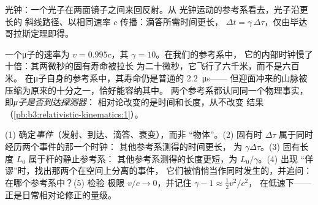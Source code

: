 \begin{omfigure}

{\small 光钟：一个光子在两面镜子之间来回反射。从
光钟运动的参考系看去，光子沿更长的
斜线路径、以相同速率 $c$ 传播：滴答所需时间更长，
$\Delta t = \gamma\,\Delta\tau$，仅由毕达哥拉斯定理即得。}
\end{omfigure}

\begin{example}[μ子的两种解释]\label{ex:b3:relativistic-kinematics:muon}
一个μ子的速率为 $v = 0.995c$，其 $\gamma = 10$。在我们的参考系中，
它的内部时钟慢了十倍：其两微秒的固有寿命被拉长
为二十微秒，它飞行了六千米，而不是六百米。
在μ子自身的参考系中，其寿命仍是普通的 \qty{2.2}{\micro s}——
但迎面冲来的山脉被压缩为原来的十分之一，恰好能容纳其中。
两个参考系都认同同一个物理事实，即\emph{μ子是否到达探测器}：
相对论改变的是时间和长度，从不改变
结果（\cref{pb:b3:relativistic-kinematics:1}）。
\end{example}

\begin{method}[理清各种效应]\label{met:b3:relativistic-kinematics:method}
(1) 确定\emph{事件}（发射、到达、滴答、衰变），而非
“物体”。(2) 固有时 $\Delta\tau$ 属于同时经历两个事件的那一个时钟：
其他参考系测得的时间更长，
为 $\gamma\Delta\tau$。(3) 固有长度 $L_0$ 属于杆的静止参考系：
其他参考系测得的长度更短，为 $L_0/\gamma$。(4) 出现
“佯谬”时，找出那两个在空间上分离的事件，
它们被悄悄当作同时发生的，并追问：在哪个参考系中？(5) 检验
极限 $v/c \to 0$，并记住 $\gamma - 1 \approx \tfrac12 v^2/c^2$，
在低速下——正是日常相对论修正的量级。
\end{method}

